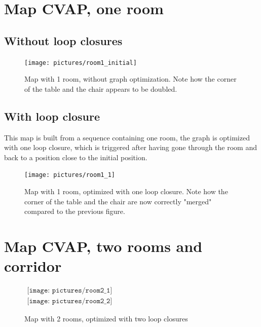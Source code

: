 
\clearpage

\section{Map CVAP, one room}

\subsection{Without loop closures}

\begin{figure}[H]
\centering
\texttt{[image: pictures/room1\_initial]}
\caption{Map with 1 room, without graph optimization. Note how the corner of the table and the chair appears to be doubled.}
\end{figure}

\subsection{With loop closure}
This map is built from a sequence containing one room, the graph is optimized with one loop closure, which is triggered after having gone through the room and back to a position close to the initial position. 

\begin{figure}[H]
\centering
\texttt{[image: pictures/room1\_1]}
\caption{Map with 1 room, optimized with one loop closure. Note how the corner of the table and the chair are now correctly "merged" compared to the previous figure.}
\end{figure}

\section{Map CVAP, two rooms and corridor}

\begin{figure}[H]
\centering$
 \begin{array}{c}
 \texttt{[image: pictures/room2\_1]}\\
 \texttt{[image: pictures/room2\_2]}
 \end{array}$
\caption{Map with 2 rooms, optimized with two loop closures}
\end{figure}

